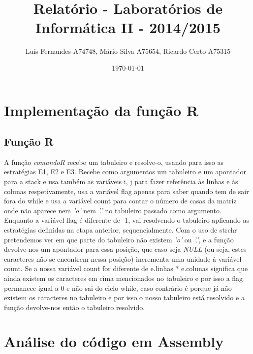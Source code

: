 \documentclass[a4paper, 12pt, portuguese]{article}
\title{Relatório - Laboratórios de Informática II - 2014/2015}
\author{Luís Fernandes A74748, Mário Silva A75654, Ricardo Certo A75315}
\date{\today}
\begin{document}
\maketitle


\section{Implementação da função R}

\subsection{Função R}
A função \emph{comandoR} recebe um tabuleiro e resolve-o, usando para isso as estratégias E1, E2 e E3.
Recebe como argumentos um tabuleiro e um apontador para a stack e usa também as variáveis i, j para fazer referência às linhas e às colunas
respetivamente, usa a variável flag apenas para saber quando tem de sair fora do while e usa a variável count para contar o
número de casas da matriz onde não aparece nem \emph{'o'} nem \emph{'.'} no tabuleiro passado como argumento.
Enquanto a variável flag é diferente de -1, vai resolvendo o tabuleiro aplicando as estratégias definidas na etapa anterior, sequencialmente.
Com o uso de strchr pretendemos ver em que parte do tabuleiro não existem \emph{'o'} ou \emph{'.'}, e a função devolve-nos um apontador para essa posição,
que caso seja \emph{NULL} (ou seja, estes caracteres não se encontrem nessa posição) incrementa uma unidade à variável count.
Se a nossa variável count for diferente de e.linhas * e.colunas significa que ainda existem os caracteres em cima mencionados no tabuleiro e
por isso a flag permanece igual a 0 e não sai do ciclo while, caso contrário é porque já não existem os caracteres no tabuleiro e por isso o
nosso tabuleiro está resolvido e a função devolve-nos então o tabuleiro resolvido.




\section{Análise do código em Assembly}
\end{document}
